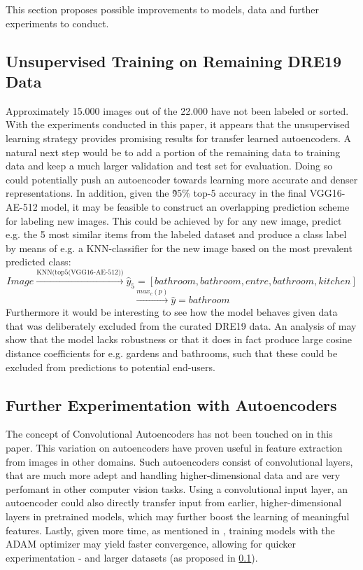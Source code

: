 This section proposes possible improvements to models, data and further experiments to conduct. 

\subsection{Unsupervised Training on Remaining DRE19 Data} \label{sec:fwork1}
Approximately 15.000 images out of the 22.000 have not been labeled or sorted. 
With the experiments conducted in this paper, it appears that the unsupervised learning strategy provides promising results for transfer learned autoencoders.
A natural next step would be to add a portion of the remaining data to training data and keep a much larger validation and test set for evaluation.
Doing so could potentially push an autoencoder towards learning more accurate and denser representations. 
\newline
\newline
In addition, given the \~95\% top-5 accuracy in the final VGG16-AE-512 model, it may be feasible to construct an overlapping prediction scheme for labeling new images.
This could be achieved by for any new image, predict e.g. the 5 most similar items from the labeled dataset and produce a class label by means of e.g. a KNN-classifier for the new image based on the most prevalent predicted class:
$$
Image \xrightarrow{\text{KNN(top5(VGG16-AE-512))}} \hat{y}_{5} = [bathroom, bathroom, entre, bathroom, kitchen]
$$
$$
\xrightarrow{\text{$max_{c}(p)$}}  \hat{y} = bathroom 
$$
\newline
Furthermore it would be interesting to see how the model behaves given data that was deliberately excluded from the curated DRE19 data. 
An analysis of may show that the model lacks robustness or that it does in fact produce large cosine distance coefficients for e.g. gardens and bathrooms, such that these could be excluded from predictions to potential end-users.

\subsection{Further Experimentation with Autoencoders}
The concept of Convolutional Autoencoders has not been touched on in this paper. 
This variation on autoencoders have proven useful in feature extraction from images\autocite{MAGGIPINTO2018126} in other domains.
Such autoencoders consist of convolutional layers, that are much more adept and handling higher-dimensional data and are very perfomant in other computer vision tasks.
Using a convolutional input layer, an autoencoder could also directly transfer input from earlier, higher-dimensional layers in pretrained models, which may further boost the learning of meaningful features. 
\newline
\newline
Lastly, given more time, as mentioned in , training models with the ADAM optimizer may yield faster convergence, allowing for quicker experimentation - and larger datasets (as proposed in \ref{sec:fwork1}).

